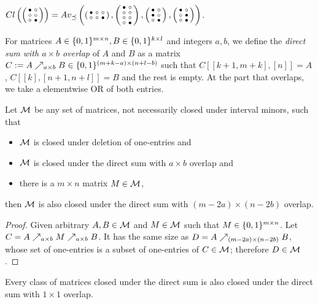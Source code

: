 \begin{prop}
$Cl\left(\left(\begin{smallmatrix}\bullet&\circ\\\circ&\circ\\\circ&\bullet\end{smallmatrix}\right)\right)=Av_{\preceq}\left(\left(\begin{smallmatrix}\bullet&\circ&\circ\\\circ&\circ&\bullet\end{smallmatrix}\right),\left(\begin{smallmatrix}\bullet&\circ\\\circ&\circ\\\circ&\circ\\\circ&\bullet\end{smallmatrix}\right),\left(\begin{smallmatrix}\bullet&\circ\\\bullet&\circ\\\circ&\bullet\end{smallmatrix}\right),\left(\begin{smallmatrix}\bullet&\circ\\\circ&\bullet\\\circ&\bullet\end{smallmatrix}\right)\right)$.
\end{prop}

\begin{defn}
For matrices $A\in\{0,1\}^{m\times n},B\in\{0,1\}^{k\times l}$ and integers $a,b$, we define the \emph{direct sum with $a\times b$ overlap} of $A$ and $B$ as a matrix $C:=A\nearrow_{a\times b}B\in\{0,1\}^{(m+k-a)\times(n+l-b)}$ such that $C[[k+1,m+k],[n]]=A$, $C[[k],[n+1,n+l]]=B$ and the rest is empty. At the part that overlaps, we take a elementwise OR of both entries.
\end{defn}

\begin{thm}
Let $\mathcal{M}$ be any set of matrices, not necessarily closed under interval minors, such that
\begin{itemize}
\item $\mathcal{M}$ is closed under deletion of one-entries and
\item $\mathcal{M}$ is closed under the direct sum with $a\times b$ overlap and
\item there is a $m\times n$ matrix $M\in\mathcal{M}$,
\end{itemize}
then $\mathcal{M}$ is also closed under the direct sum with $(m-2a)\times(n-2b)$ overlap.
\end{thm}
\begin{proof}
Given arbitrary $A,B\in\mathcal{M}$ and $M\in\mathcal{M}$ such that $M\in\{0,1\}^{m\times n}$. Let $C=A\nearrow_{a\times b}M\nearrow_{a\times b}B$. It has the same size as $D=A\nearrow_{(m-2a)\times(n-2b)}B$, whose set of one-entries is a subset of one-entries of $C\in\mathcal{M}$; therefore $D\in\mathcal{M}$.
\end{proof}

\begin{obs}
\label{obs:0to1}
Every class of matrices closed under the direct sum is also closed under the direct sum with $1\times1$ overlap.
\end{obs}

